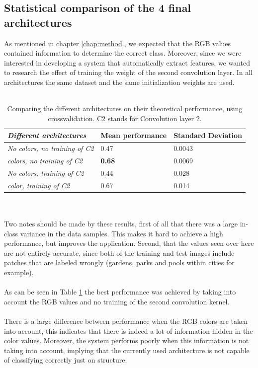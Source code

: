 \documentclass[a4paper,onecolumn]{report}
\begin{document}
\subsection{Statistical comparison of the 4 final architectures}
As mentioned in chapter \ref{chap:method}, we expected that the RGB values contained information to determine the correct class. Moreover, since we were interested in developing a system that automatically extract features, we wanted to research the effect of training the weight of the second convolution layer. In all architectures the same dataset and the same initialization weights are used.
\\\\
\begin{table}[h!]
\begin{tabular}{ | l | l | l | }
\hline
	\textbf{\textit{Different architectures}} & \textbf{Mean performance} &\textbf{Standard Deviation}   \\ \hline
	\textit{No colors, no training of C2 }& 0.47 & 0.0043 \\ \hline
	\textit{colors, no training of C2} & \textbf{0.68}& 0.0069 \\ \hline
	\textit{No colors, training of C2} & 0.44 & 0.028 \\ \hline
	\textit{color, training of C2} & 0.67 & 0.014 \\ \hline
\end{tabular}
\caption{Comparing the different architectures on their theoretical performance, using crossvalidation. C2 stands for Convolution layer 2.}
\label{tab:crossvalidation results}
\end{table}
\\\\
Two notes should be made by these results, first of all that there was a large in-class variance in the data samples. This makes it hard to achieve a high performance, but improves the application. Second, that the values seen over here are not entirely accurate, since both of the training and test images include patches that are labeled wrongly (gardens, parks and pools within cities for example).
\\\\
As can be seen in Table \ref{tab:crossvalidation results} the best performance was achieved by taking into account the RGB values and no training of the second convolution kernel.
\\\\
There is a large difference between performance when the RGB colors are taken into account, this indicates that there is indeed a lot of information hidden in the color values. Moreover, the system performs poorly when this information is not taking into account, implying that the currently used architecture is not capable of classifying correctly just on structure.
\end{document}

